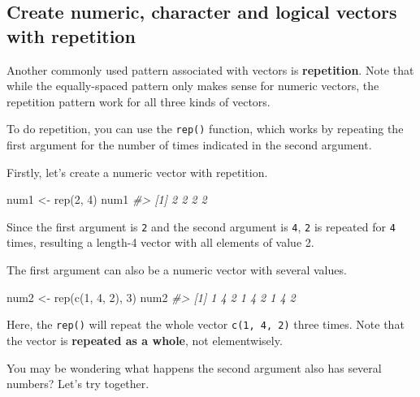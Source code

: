 \documentclass[
]{book}
\newenvironment{Shaded}{\begin{snugshade}}{\end{snugshade}}
\newcommand{\CommentTok}[1]{\textcolor[rgb]{0.56,0.35,0.01}{\textit{#1}}}
\newcommand{\DecValTok}[1]{\textcolor[rgb]{0.00,0.00,0.81}{#1}}
\newcommand{\FunctionTok}[1]{\textcolor[rgb]{0.00,0.00,0.00}{#1}}
\newcommand{\NormalTok}[1]{#1}
\newcommand{\OtherTok}[1]{\textcolor[rgb]{0.56,0.35,0.01}{#1}}
\begin{document}
\hypertarget{create-numeric-character-and-logical-vectors-with-repetition}{%
\subsection{Create numeric, character and logical vectors with repetition}\label{create-numeric-character-and-logical-vectors-with-repetition}}

Another commonly used pattern associated with vectors is \textbf{repetition}. Note that while the equally-spaced pattern only makes sense for numeric vectors, the repetition pattern work for all three kinds of vectors.

To do repetition, you can use the \texttt{rep()} function, which works by repeating the first argument for the number of times indicated in the second argument.

Firstly, let's create a numeric vector with repetition.

\begin{Shaded}
\begin{Highlighting}[]
\NormalTok{num1 }\OtherTok{\textless{}{-}} \FunctionTok{rep}\NormalTok{(}\DecValTok{2}\NormalTok{, }\DecValTok{4}\NormalTok{)}
\NormalTok{num1}
\CommentTok{\#\textgreater{} [1] 2 2 2 2}
\end{Highlighting}
\end{Shaded}

Since the first argument is \texttt{2} and the second argument is \texttt{4}, \texttt{2} is repeated for \texttt{4} times, resulting a length-4 vector with all elements of value 2.

The first argument can also be a numeric vector with several values.

\begin{Shaded}
\begin{Highlighting}[]
\NormalTok{num2 }\OtherTok{\textless{}{-}} \FunctionTok{rep}\NormalTok{(}\FunctionTok{c}\NormalTok{(}\DecValTok{1}\NormalTok{, }\DecValTok{4}\NormalTok{, }\DecValTok{2}\NormalTok{), }\DecValTok{3}\NormalTok{)}
\NormalTok{num2}
\CommentTok{\#\textgreater{} [1] 1 4 2 1 4 2 1 4 2}
\end{Highlighting}
\end{Shaded}

Here, the \texttt{rep()} will repeat the whole vector \texttt{c(1,\ 4,\ 2)} three times. Note that the vector is \textbf{repeated as a whole}, not elementwisely.

You may be wondering what happens the second argument also has several numbers? Let's try together.
\end{document}
